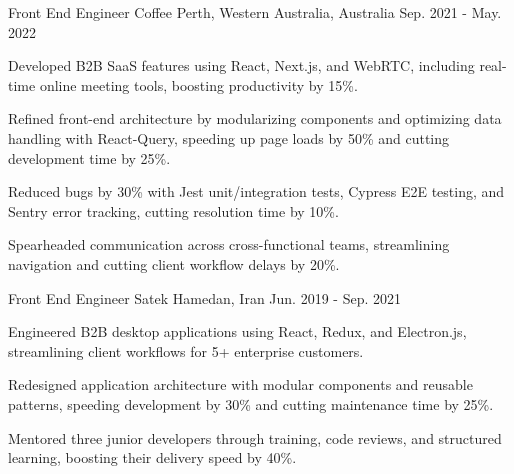 \begin{cventries}
  \cventry
  {Front End Engineer} %
  {Coffee} %
  {Perth, Western Australia, Australia} %
  {Sep. 2021 - May. 2022} %
  {
    \begin{cvitems} %
      \item {Developed B2B SaaS features using React, Next.js, and WebRTC, including real-time online meeting tools, boosting productivity by 15\%.}
      \item {Refined front-end architecture by modularizing components and optimizing data handling with React-Query, speeding up page loads by 50\% and cutting development time by 25\%.}
      \item {Reduced bugs by 30\% with Jest unit/integration tests, Cypress E2E testing, and Sentry error tracking, cutting resolution time by 10\%.}
      \item {Spearheaded communication across cross-functional teams, streamlining navigation and cutting client workflow delays by 20\%.}
    \end{cvitems}
  }

  \cventry
  {Front End Engineer} %
  {Satek} %
  {Hamedan, Iran} %
  {Jun. 2019 - Sep. 2021} %
  {
    \begin{cvitems} %
      \item {Engineered B2B desktop applications using React, Redux, and Electron.js, streamlining client workflows for 5+ enterprise customers.}
      \item {Redesigned application architecture with modular components and reusable patterns, speeding development by 30\% and cutting maintenance time by 25\%.}
      \item {Mentored three junior developers through training, code reviews, and structured learning, boosting their delivery speed by 40\%.}
    \end{cvitems}
  }
\end{cventries}
